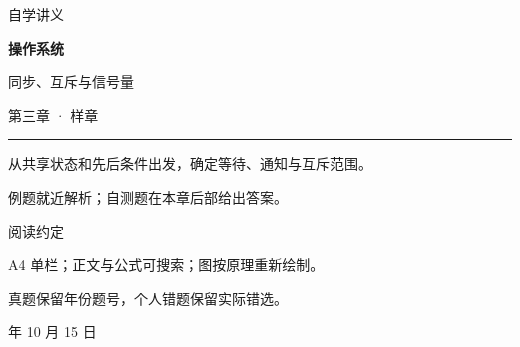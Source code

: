 \documentclass[11pt,a4paper,oneside]{report}
\begin{document}
\begin{titlepage}
\thispagestyle{empty}
\vspace*{19mm}
{\sffamily\color{accent}\fontsize{15}{22} 自学讲义}\par
\vspace{12mm}
{\sffamily\bfseries\color{ink}\fontsize{34}{45}\selectfont 操作系统}\par
\vspace{6mm}
{\sffamily\color{ink}\fontsize{23}{32}\selectfont 同步、互斥与信号量}\par
\vspace{9mm}
{\sffamily\large 第三章 · 样章}\par
\vspace{17mm}
\noindent\rule{\textwidth}{0.5pt}\par
\vspace{4mm}
\noindent 从共享状态和先后条件出发，确定等待、通知与互斥范围。\par
\noindent 例题就近解析；自测题在本章后部给出答案。\par
\vfill
\noindent 阅读约定\par
\noindent A4 单栏；正文与公式可搜索；图按原理重新绘制。\par
\noindent 真题保留年份题号，个人错题保留实际错选。\par
\vspace{8mm}
 年 10 月 15 日\par
\end{titlepage}
\tableofcontents
\clearpage
{}
\setcounter{chapter}{2}

\end{document}
